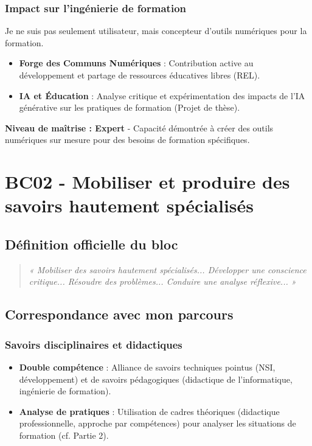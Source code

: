 \subsubsection{Impact sur l'ingénierie de formation}
Je ne suis pas seulement utilisateur, mais concepteur d'outils numériques pour la formation.
\begin{itemize}[leftmargin=*]
    \item \textbf{Forge des Communs Numériques} : Contribution active au développement et partage de ressources éducatives libres (REL).
    \item \textbf{IA et Éducation} : Analyse critique et expérimentation des impacts de l'IA générative sur les pratiques de formation (Projet de thèse).
\end{itemize}

\textbf{Niveau de maîtrise : Expert} - Capacité démontrée à créer des outils numériques sur mesure pour des besoins de formation spécifiques.

\vspace{1cm}

\section{BC02 - Mobiliser et produire des savoirs hautement spécialisés}

\subsection{Définition officielle du bloc}
\begin{quote}
\textit{« Mobiliser des savoirs hautement spécialisés... Développer une conscience critique... Résoudre des problèmes... Conduire une analyse réflexive... »} \parencite{rncp38152}
\end{quote}

\subsection{Correspondance avec mon parcours}

\subsubsection{Savoirs disciplinaires et didactiques}
\begin{itemize}[leftmargin=*]
    \item \textbf{Double compétence} : Alliance de savoirs techniques pointus (NSI, développement) et de savoirs pédagogiques (didactique de l'informatique, ingénierie de formation).
    \item \textbf{Analyse de pratiques} : Utilisation de cadres théoriques (didactique professionnelle, approche par compétences) pour analyser les situations de formation (cf. Partie 2).
\end{itemize}

